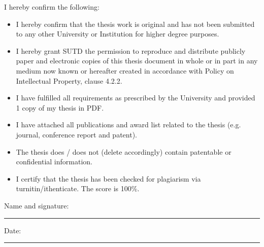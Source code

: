 \documentclass[
11pt, %
oneside, %
english, %
singlespacing, %
headsepline, %
]{MastersDoctoralThesis} %
\begin{document}
\begin{declaration}
	\addchaptertocentry{\authorshipname}


	I hereby confirm the following:
	\begin{itemize}
		\item I hereby confirm that the thesis work is original and has not been submitted to any other University or Institution for higher degree purposes.
		\item I hereby grant SUTD the permission to reproduce and distribute publicly paper and electronic copies of this thesis document in whole or in part in any medium now known or hereafter created in accordance with Policy on Intellectual Property, clause 4.2.2.
		\item I have fulfilled all requirements as prescribed by the University and provided 1 copy of my thesis in PDF.
		\item I have attached all publications and award list related to the thesis (e.g. journal, conference report and patent).
		\item The thesis does / does not (delete accordingly) contain patentable or confidential information.
		\item I certify that the thesis has been checked for plagiarism via turnitin/ithenticate. The score is 100\%.
	\end{itemize}

	\noindent Name and signature:\\
	\rule[0.5em]{25em}{0.5pt} %

	\noindent Date:\\
	\rule[0.5em]{25em}{0.5pt} %
\end{declaration}
\end{document}
